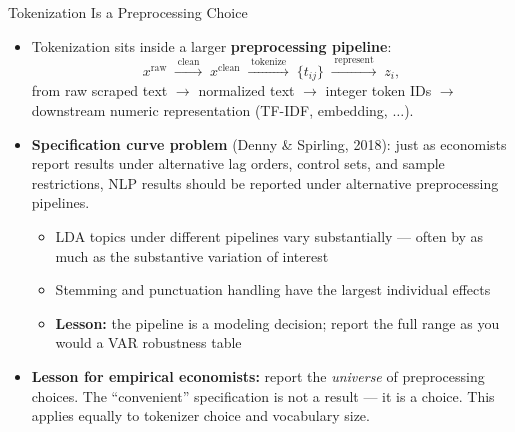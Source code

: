\begin{frame}{Tokenization Is a Preprocessing Choice}
\begin{itemize}
\item Tokenization sits inside a larger \textbf{preprocessing pipeline}:
\[
   x^{\text{raw}} \;\xrightarrow{\;\text{clean}\;}\; x^{\text{clean}}
   \;\xrightarrow{\;\text{tokenize}\;}\; \{t_{ij}\}
   \;\xrightarrow{\;\text{represent}\;}\; z_i,
\]
from raw scraped text $\to$ normalized text $\to$ integer token IDs $\to$ downstream numeric representation (TF-IDF, embedding, $\ldots$).

\medskip
\item \textbf{Specification curve problem} (Denny \& Spirling, 2018): just as economists report results under alternative lag orders, control sets, and sample restrictions, NLP results should be reported under alternative preprocessing pipelines.
\begin{itemize}
    \item LDA topics under different pipelines vary substantially --- often by as much as the substantive variation of interest
    \item Stemming and punctuation handling have the largest individual effects
    \item \textbf{Lesson:} the pipeline is a modeling decision; report the full range as you would a VAR robustness table
\end{itemize}

\medskip
\item \textbf{Lesson for empirical economists:} report the \emph{universe} of preprocessing choices. The ``convenient'' specification is not a result --- it is a choice. This applies equally to tokenizer choice and vocabulary size.
\end{itemize}
\end{frame}


